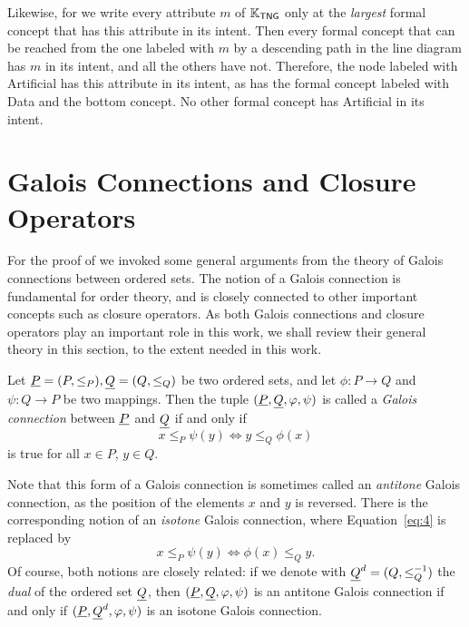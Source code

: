 \begin{Example}
  Likewise, for we write every attribute $m$ of ${\mathbb{K}}_{\mathsf{TNG}}$ only at the
  \emph{largest} formal concept that has this attribute in its intent.  Then every formal
  concept that can be reached from the one labeled with $m$ by a \textsf{descending} path
  in the line diagram has $m$ in its intent, and all the others have not.  Therefore, the
  node labeled with \textsf{Artificial} has this attribute in its intent, as has the
  formal concept labeled with \textsf{Data} and the bottom concept.  No other formal
  concept has \textsf{Artificial} in its intent.
\end{Example}

\section{Galois Connections and Closure Operators}
\label{sec:galois-connections}

For the proof of  we invoked some general
arguments from the theory of Galois connections between ordered sets.  The notion of a
Galois connection is fundamental for order theory, and is closely connected to other
important concepts such as closure operators.  As both Galois connections and closure
operators play an important role in this work, we shall review their general theory in
this section, to the extent needed in this work.

\begin{Definition}
  \label{def:galois-connection}
  Let ${\underline{P}} = (P, \leq_P), {\underline{Q}} = (Q, \leq_Q)$ be two ordered sets, and let $\phi
  \colon P \to Q$ and $\psi \colon Q \to P$ be two mappings.  Then the tuple $({\underline{P}},
  {\underline{Q}}, \varphi, \psi)$ is called a \emph{Galois connection} between ${\underline{P}}$ and ${\underline{Q}}$
  if and only if
  \begin{equation}
    \label{eq:4}
    x \leq_P \psi(y) \iff y \leq_Q \phi(x)
  \end{equation}
  is true for all $x \in P$, $y \in Q$.
\end{Definition}

Note that this form of a Galois connection is sometimes called an \emph{antitone} Galois
connection, as the position of the elements $x$ and $y$ is reversed.  There is the
corresponding notion of an \emph{isotone} Galois connection, where Equation~\eqref{eq:4}
is replaced by
\begin{equation}
  \label{eq:5}
  x \leq_P \psi(y) \iff \phi(x) \leq_Q y.
\end{equation}
Of course, both notions are closely related: if we denote with ${\underline{Q}}^d = (Q,
\leq_Q^{-1})$ the \emph{dual} of the ordered set ${\underline{Q}}$, then $({\underline{P}}, {\underline{Q}}, \varphi,
\psi)$ is an antitone Galois connection if and only if $({\underline{P}}, {\underline{Q}}^d, \varphi, \psi)$ is
an isotone Galois connection.

